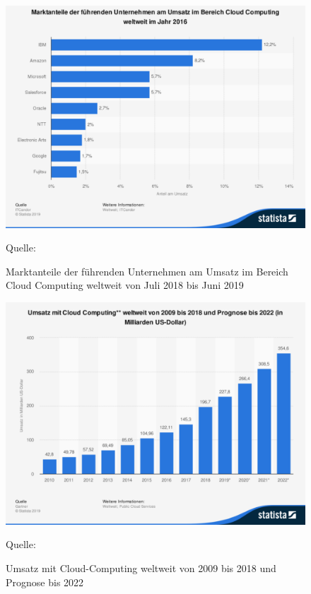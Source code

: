 \begin{figure}[H]
	\centering
	\includegraphics[scale=0.43]{img/statistic_id150979_marktanteile-der-fuehrenden-unternehmen-im-bereich-cloud-computing-weltweit-2019.pdf}
	\caption{Marktanteile der führenden Unternehmen am Umsatz im Bereich Cloud Computing weltweit von Juli 2018 bis Juni 2019}
	{\footnotesize Quelle: \cite{itcandor_cloud_2019}}
	\label{abb:marktanteileCC19}
\end{figure}

\begin{figure}[H]
	\centering
	\includegraphics[scale=0.43]{img/statistic_id195760_prognose-zum-umsatz-mit-cloud-computing-weltweit-bis-2022.pdf}
	\caption{Umsatz mit Cloud-Computing weltweit von 2009 bis 2018 und Prognose bis 2022 }
	{\footnotesize Quelle: \cite{gartner_cloud_2019}}
	\label{abb:umsatzprognoseCC}
\end{figure}


